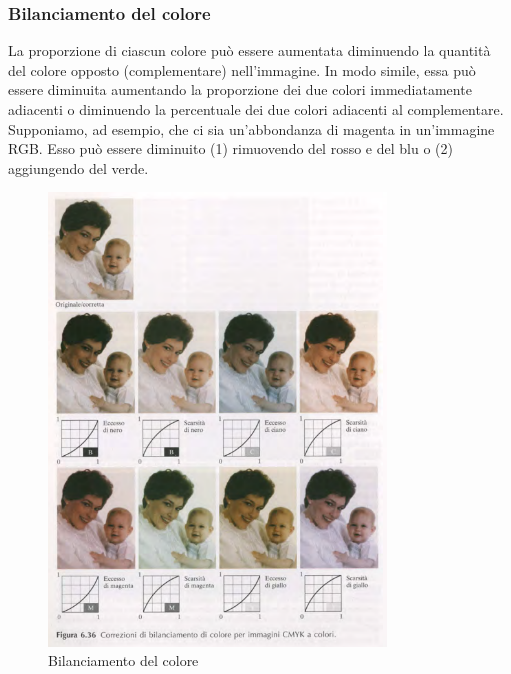 \documentclass[12pt]{article}
\begin{document}
\subsubsection{Bilanciamento del colore}
La proporzione di ciascun colore può essere aumentata diminuendo la quantità del colore opposto (complementare) nell'immagine. In modo simile, essa può essere diminuita aumentando la proporzione dei due colori immediatamente adiacenti o diminuendo la percentuale dei due colori adiacenti al complementare. Supponiamo, ad esempio, che ci sia un'abbondanza di magenta in un'immagine RGB.
Esso può essere diminuito (1) rimuovendo del rosso e del blu o (2) aggiungendo del verde.
\begin{figure}[!htb]
    \centering
    \includegraphics[width=0.8\textwidth]{Images/bil.png}
    \caption{Bilanciamento del colore}
\end{figure}
\FloatBarrier
\newpage
\end{document}
